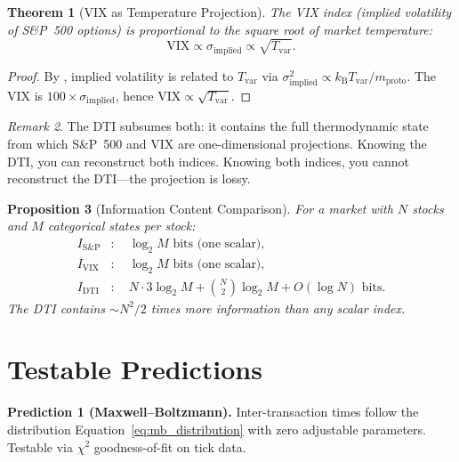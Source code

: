 \documentclass[twocolumn,10pt]{article}
\newtheorem{theorem}{Theorem}[section]
\newtheorem{proposition}[theorem]{Proposition}
\theoremstyle{remark}
\newtheorem{remark}[theorem]{Remark}
\newcommand{\kB}{k_{\mathrm{B}}}
\newcommand{\Tvar}{T_{\mathrm{var}}}
\newcommand{\mproto}{m_{\mathrm{proto}}}
\newcommand{\eqnref}[1]{Equation~\ref{#1}}
\begin{document}
\begin{theorem}[VIX as Temperature Projection]
\label{thm:vix}
The VIX index (implied volatility of S\&P~500 options) is proportional to the square root of market temperature:
\begin{equation}
    \mathrm{VIX} \propto \sigma_{\mathrm{implied}} \propto \sqrt{\Tvar}.
    \label{eq:vix_projection}
\end{equation}
\end{theorem}

\begin{proof}
By , implied volatility is related to $\Tvar$ via $\sigma_{\mathrm{implied}}^2 \propto \kB\Tvar/\mproto$.  The VIX is $100 \times \sigma_{\mathrm{implied}}$, hence $\mathrm{VIX} \propto \sqrt{\Tvar}$.
\end{proof}

\begin{remark}
The DTI subsumes both: it contains the full thermodynamic state from which S\&P~500 and VIX are one-dimensional projections.  Knowing the DTI, you can reconstruct both indices.  Knowing both indices, you cannot reconstruct the DTI---the projection is lossy.
\end{remark}

\begin{proposition}[Information Content Comparison]
\label{prop:info_comparison}
For a market with $N$ stocks and $M$ categorical states per stock:
\begin{align}
    I_{\mathrm{S\&P}} &: \quad \log_2 M \text{ bits (one scalar)}, \\
    I_{\mathrm{VIX}} &: \quad \log_2 M \text{ bits (one scalar)}, \\
    I_{\mathrm{DTI}} &: \quad N \cdot 3 \log_2 M + \binom{N}{2}\log_2 M + O(\log N) \text{ bits}.
\end{align}
The DTI contains $\sim N^2 / 2$ times more information than any scalar index.
\end{proposition}


\section{Testable Predictions}
\label{sec:predictions}

\textbf{Prediction 1 (Maxwell--Boltzmann).}  Inter-transaction times follow the distribution \eqnref{eq:mb_distribution} with zero adjustable parameters.  Testable via $\chi^2$ goodness-of-fit on tick data.
\end{document}
